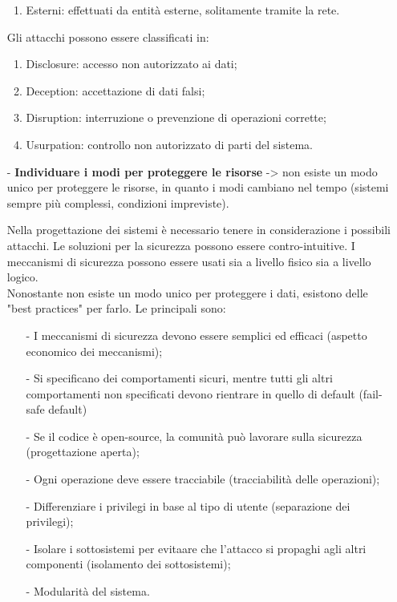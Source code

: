 \documentclass[a4paper, 10pt]{report}
\begin{document}
\begin{itemize}
\begin{enumerate}
\item Esterni: effettuati da entità esterne, solitamente tramite la rete.
\end{enumerate}
\noindent Gli attacchi possono essere classificati in:
\begin{enumerate}
\item Disclosure: accesso non autorizzato ai dati;
\item Deception: accettazione di dati falsi;
\item Disruption: interruzione o prevenzione di operazioni corrette;
\item Usurpation: controllo non autorizzato di parti del sistema. 
\end{enumerate}
\item[-] \textbf{Individuare i modi per proteggere le risorse} -> non esiste un modo unico per proteggere le risorse, in quanto i modi cambiano nel tempo (sistemi sempre più complessi, condizioni impreviste). 

\noindent Nella progettazione dei sistemi è necessario tenere in considerazione i possibili attacchi. Le soluzioni per la sicurezza possono essere contro-intuitive. I meccanismi di sicurezza possono essere usati sia a livello fisico sia a livello logico.
\\

\noindent Nonostante non esiste un modo unico per proteggere i dati, esistono delle "best practices" per farlo. Le principali sono:
\begin{itemize}
\item[-] I meccanismi di sicurezza devono essere semplici ed efficaci (aspetto economico dei meccanismi);
\item[-] Si specificano dei comportamenti sicuri, mentre tutti gli altri comportamenti non specificati devono rientrare in quello di default (fail-safe default)
\item[-] Se il codice è open-source, la comunità può lavorare sulla sicurezza (progettazione aperta);
\item[-] Ogni operazione deve essere tracciabile (tracciabilità delle operazioni);
\item[-] Differenziare i privilegi in base al tipo di utente (separazione dei privilegi);
\item[-] Isolare i sottosistemi per evitaare che l'attacco si propaghi agli altri componenti (isolamento dei sottosistemi);
\item[-] Modularità del sistema.
\end{itemize}


\end{itemize}
\end{document}
